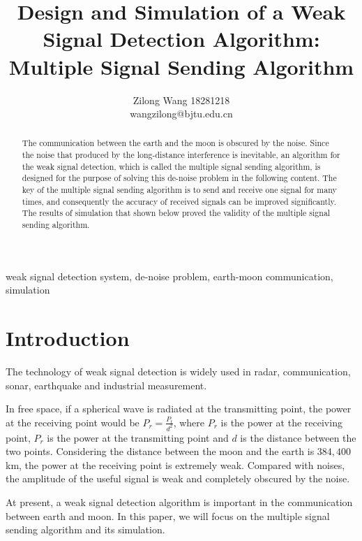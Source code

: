 \documentclass[conference]{IEEEtran}
\begin{document}
\title{Design and Simulation of a Weak Signal Detection Algorithm: Multiple Signal Sending Algorithm}
\author{Zilong Wang 18281218\\wangzilong@bjtu.edu.cn
 }


\maketitle
\begin{abstract}
The communication between the earth and the moon is obscured by the noise. Since the noise that produced by the long-distance interference is inevitable, an algorithm for the weak signal detection, which is called the multiple signal sending algorithm, is designed for the purpose of solving this de-noise problem in the following content. The key of the multiple signal sending algorithm is to send and receive one signal for many times, and consequently the accuracy of received signals can be improved significantly. The results of simulation that shown below proved the validity of the multiple signal sending algorithm.
\end{abstract}

\begin{IEEEkeywords}
weak signal detection system, de-noise problem, earth-moon communication, simulation
\end{IEEEkeywords}


\section{Introduction}
The technology of weak signal detection is widely used in radar, communication, sonar, earthquake and industrial measurement\cite{b1}.

In free space, if a spherical wave is radiated at the transmitting point, the power at the receiving point would be $P_r=\frac{P_t}{d^2}$, where $P_r$ is the power at the receiving point, $P_r$ is the power at the transmitting point and $d$ is the distance between the two points. Considering the distance between the moon and the earth is $384,400$km, the power at the receiving point is extremely weak. Compared with noises, the amplitude of the useful signal is weak and completely obscured by the noise\cite{b2}.

At present, a weak signal detection algorithm is important in the communication between earth and moon. In this paper, we will focus on the multiple signal sending algorithm and its simulation.
\end{document}
